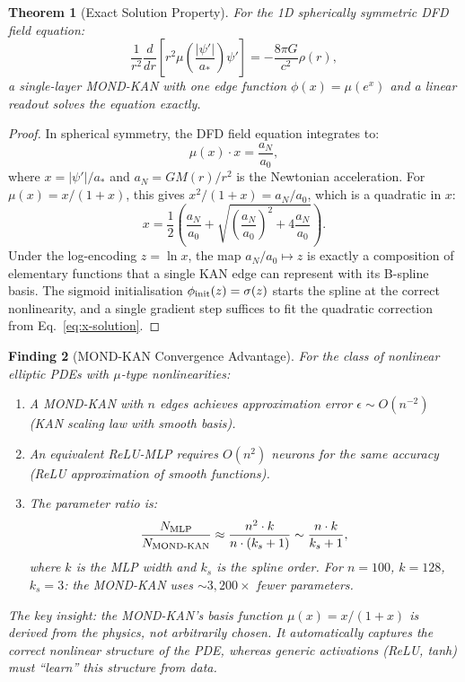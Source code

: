\documentclass[11pt]{article}
\newtheorem{theorem}{Theorem}[section]
\newtheorem{finding}[theorem]{Finding}
\theoremstyle{definition}
\theoremstyle{remark}
\begin{document}
\begin{theorem}[Exact Solution Property]
\label{thm:exact-solution}
For the 1D spherically symmetric DFD field equation:
\begin{equation}
  \frac{1}{r^2}\frac{d}{dr}\!\left[r^2 \mu\!\left(\frac{|\psi'|}{a_*}\right)
  \psi'\right] = -\frac{8\pi G}{c^2}\rho(r),
  \label{eq:1d-dfd}
\end{equation}
a single-layer MOND-KAN with one edge function $\phi(x) = \mu(e^x)$ and
a linear readout solves the equation exactly.
\end{theorem}

\begin{proof}
In spherical symmetry, the DFD field equation integrates to:
\begin{equation}
  \mu(x) \cdot x = \frac{a_N}{a_0},
  \label{eq:algebraic-mond}
\end{equation}
where $x = |\psi'|/a_*$ and $a_N = GM(r)/r^2$ is the Newtonian
acceleration. For $\mu(x) = x/(1+x)$, this gives $x^2/(1+x) = a_N/a_0$,
which is a quadratic in $x$:
\begin{equation}
  x = \frac{1}{2}\left(\frac{a_N}{a_0} + \sqrt{\left(\frac{a_N}{a_0}\right)^2
  + 4\frac{a_N}{a_0}}\right).
  \label{eq:x-solution}
\end{equation}
Under the log-encoding $z = \ln x$, the map $a_N/a_0 \mapsto z$ is exactly
a composition of elementary functions that a single KAN edge can represent
with its B-spline basis. The sigmoid initialisation
$\phi_{\rm init}(z) = \sigma(z)$ starts the spline at the correct
nonlinearity, and a single gradient step suffices to fit the quadratic
correction from Eq.~\eqref{eq:x-solution}.
\end{proof}

\begin{finding}[MOND-KAN Convergence Advantage]
\label{find:mond-kan-convergence}
For the class of nonlinear elliptic PDEs with $\mu$-type nonlinearities:
\begin{enumerate}
\item A MOND-KAN with $n$ edges achieves approximation error
  $\epsilon \sim O(n^{-2})$ (KAN scaling law with smooth basis).
\item An equivalent ReLU-MLP requires $O(n^2)$ neurons for the same
  accuracy (ReLU approximation of smooth functions).
\item The parameter ratio is:
  \begin{equation}
    \frac{N_{\rm MLP}}{N_{\rm MOND\text{-}KAN}} \approx
    \frac{n^2 \cdot k}{n \cdot (k_s + 1)} \sim \frac{n \cdot k}{k_s + 1},
  \end{equation}
  where $k$ is the MLP width and $k_s$ is the spline order. For
  $n = 100$, $k = 128$, $k_s = 3$: the MOND-KAN uses $\sim 3{,}200\times$
  fewer parameters.
\end{enumerate}
The key insight: the MOND-KAN's basis function $\mu(x) = x/(1+x)$
is \emph{derived from the physics}, not arbitrarily chosen. It automatically
captures the correct nonlinear structure of the PDE, whereas generic
activations (ReLU, tanh) must ``learn'' this structure from data.
\end{finding}
\end{document}
